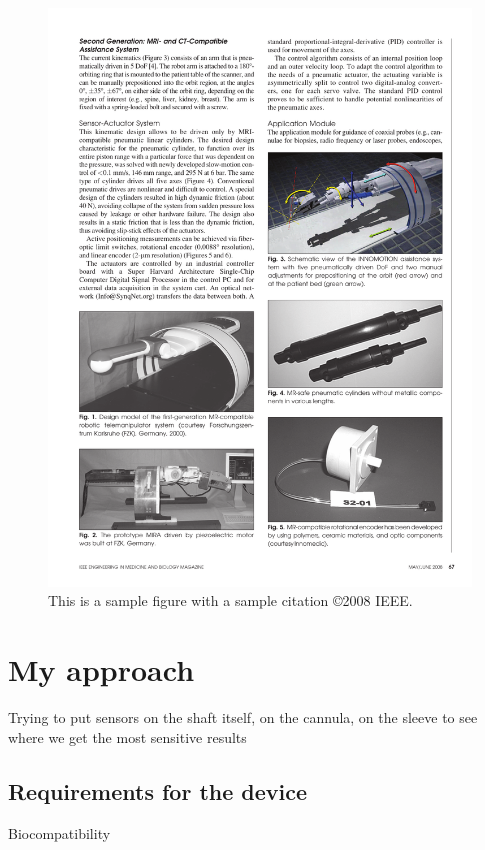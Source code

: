\begin{figure}[h]
  \begin{center}
    \includegraphics[width=120mm]{Fig/chap1/innomotion.pdf}
  \end{center}
  \vspace{-4mm}
\caption[CAD model of the Innomotion robotic system.]
{This is a sample figure with a sample citation \cite{Fischer2008_TMECH} \copyright 2008 IEEE.}
 \label{fig:exampleFigure}
\vspace{-2mm}
\end{figure}

\section{My approach}
\label{sec:MyAppr}
Trying to put sensors on the shaft itself, on the cannula, on the sleeve to see where we get the most sensitive results

\subsection{Requirements for the device}
\label{sec:DevReq}
Biocompatibility

